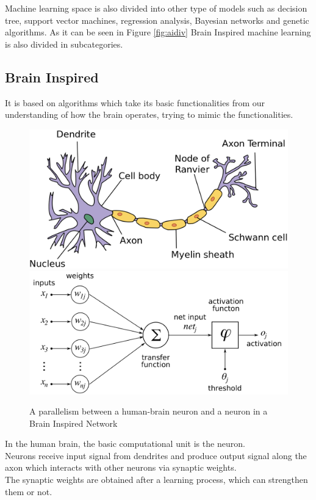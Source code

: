 Machine learning space is also divided into other type of models such as decision tree, support vector machines, regression analysis, Bayesian networks and genetic algorithms.
As it can be seen in Figure \ref{fig:aidiv} Brain Inspired machine learning is also divided in subcategories.
\subsection{Brain Inspired}
It is based on algorithms which take its basic functionalities from our understanding of how the brain operates, trying to mimic the functionalities.
\begin{figure}[H]
\centering
\captionsetup{justification=centering}
\includegraphics[scale=0.15]{./figure/human_neuron.png}\\

\includegraphics[scale=0.15]{./figure/nn_neuron.png}

\caption[A parallelism between a human-brain neuron and a neuron in a Brain Inspired Network]{A parallelism between a human-brain neuron and a neuron in a Brain Inspired Network\protect\footnotemark}
\label{fig:neuron}
\end{figure}

In the human brain, the basic computational unit is the neuron.\\ Neurons receive input signal from dendrites and produce output signal along the axon which interacts with other neurons via synaptic weights.\\ The synaptic weights are obtained after a learning process, which can strengthen them or not.
